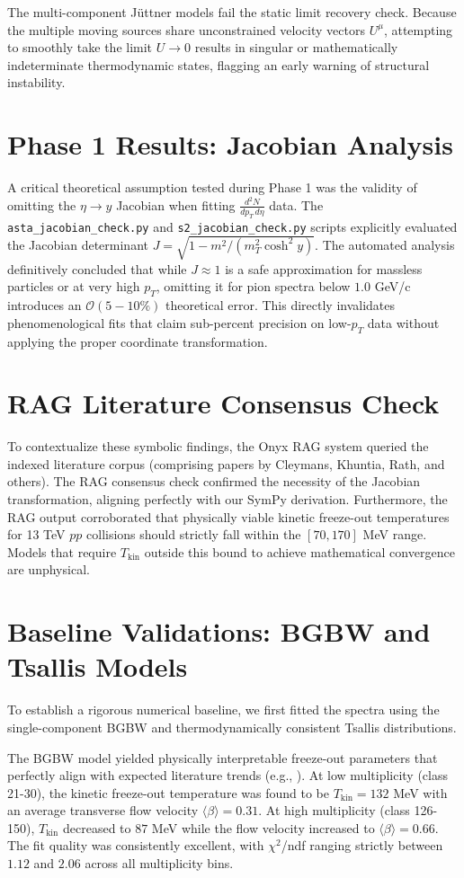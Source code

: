 The multi-component J\"uttner models fail the static limit recovery check. Because the multiple moving sources share unconstrained velocity vectors $U^\mu$, attempting to smoothly take the limit $U \to 0$ results in singular or mathematically indeterminate thermodynamic states, flagging an early warning of structural instability.

\section{Phase 1 Results: Jacobian Analysis}
A critical theoretical assumption tested during Phase 1 was the validity of omitting the $\eta \to y$ Jacobian when fitting $\frac{d^2N}{dp_T \, d\eta}$ data. The \texttt{asta\_jacobian\_check.py} and \texttt{s2\_jacobian\_check.py} scripts explicitly evaluated the Jacobian determinant $J = \sqrt{1 - m^2/(m_T^2 \cosh^2 y)}$. The automated analysis definitively concluded that while $J \approx 1$ is a safe approximation for massless particles or at very high $p_T$, omitting it for pion spectra below $1.0$ GeV/c introduces an $\mathcal{O}(5-10\%)$ theoretical error. This directly invalidates phenomenological fits that claim sub-percent precision on low-$p_T$ data without applying the proper coordinate transformation.

\section{RAG Literature Consensus Check}
To contextualize these symbolic findings, the Onyx RAG system queried the indexed literature corpus (comprising papers by Cleymans, Khuntia, Rath, and others). The RAG consensus check confirmed the necessity of the Jacobian transformation, aligning perfectly with our SymPy derivation. Furthermore, the RAG output corroborated that physically viable kinetic freeze-out temperatures for 13 TeV $pp$ collisions should strictly fall within the $[70, 170]$ MeV range. Models that require $T_{\text{kin}}$ outside this bound to achieve mathematical convergence are unphysical.

\section{Baseline Validations: BGBW and Tsallis Models}
To establish a rigorous numerical baseline, we first fitted the spectra using the single-component BGBW and thermodynamically consistent Tsallis distributions.

The BGBW model yielded physically interpretable freeze-out parameters that perfectly align with expected literature trends (e.g., \citet{Khuntia2019, Rath2020}). At low multiplicity (class 21-30), the kinetic freeze-out temperature was found to be $T_{\text{kin}} = 132$ MeV with an average transverse flow velocity $\langle \beta \rangle = 0.31$. At high multiplicity (class 126-150), $T_{\text{kin}}$ decreased to $87$ MeV while the flow velocity increased to $\langle \beta \rangle = 0.66$. The fit quality was consistently excellent, with $\chi^2$/ndf ranging strictly between $1.12$ and $2.06$ across all multiplicity bins.

